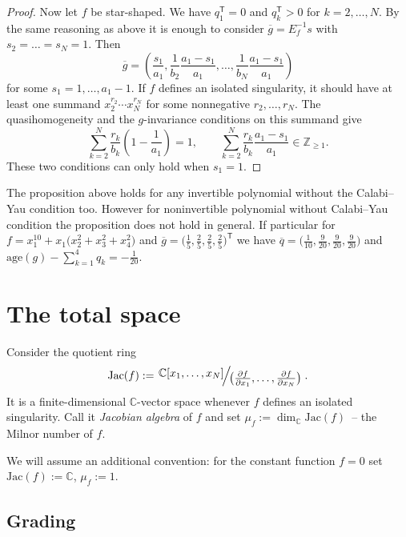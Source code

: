 \documentclass[pdftex]{sigma}
\numberwithin{equation}{section}
\newcommand{\CC}{{\mathbb{C}}}
\newcommand{\ZZ}{{\mathbb{Z}}}
\newcommand{\Jac}{\mathrm{Jac}}
\newcommand{\age}{\mathrm{age}}
\newcommand{\QR}[2]{
\left.\raisebox{0.5ex}{\ensuremath{#1}}
\ensuremath{\mkern-3mu}\Big/\ensuremath{\mkern-3mu}
\raisebox{-0.5ex}{\ensuremath{#2}}\right.}
\begin{document}
\begin{proof}
Now let $f$ be star-shaped. We have $q_1^{\mathsf{T}} = 0$ and $q_k^{\mathsf{T}} > 0$ for $k=2,\dots,N$. By the same reasoning as above it is enough to consider $\overline g = E_f^{-1}s$ with $s_2 = \dots = s_N = 1$. Then
\[
 \overline g = \left(\frac{s_1}{a_1}, \frac{1}{b_2}\frac{a_1-s_1}{a_1}, \dots, \frac{1}{b_{N}}\frac{a_1-s_1}{a_1} \right)
\]
for some $s_1 = 1,\dots,a_1-1$.
If $f$ defines an isolated singularity, it should have at least one summand $x_2^{r_2}\cdots x_N^{r_N}$ for some nonnegative $r_2,\dots,r_N$. The quasihomogeneity and the $g$-invariance conditions on this summand give
\[
 \sum_{k=2}^N \frac{r_k}{b_k}\left(1 - \frac{1}{a_1}\right) = 1, \qquad \sum_{k=2}^N \frac{r_k}{b_k}\frac{a_1-s_1}{a_1} \in \ZZ_{\ge 1}.
\]
These two conditions can only hold when $s_1=1$.
\end{proof}

\begin{Remark}
The proposition above holds for any invertible polynomial without the Calabi--Yau condition too. However for noninvertible polynomial without Calabi--Yau condition the proposition does not hold in general. If particular for ${f = x_1^{10} + x_1\bigl(x_2^2 + x_3^2 + x_4^2\bigr)}$ and $\overline g = \bigl(\frac{1}{5},\frac{2}{5},\frac{2}{5},\frac{2}{5}\bigr)^{\mathsf{T}}$ we have $\overline q = \bigl(\frac{1}{10},\frac{9}{20},\frac{9}{20},\frac{9}{20}\bigr)$ and $\age(g) - \sum_{k=1}^4 q_k = -\frac{1}{20}$.
\end{Remark}

\section{The total space}\label{section: total space}
Consider the quotient ring
\begin{equation*}
	\Jac(f) := \QR{\CC[x_1,\dots, x_N]}{\bigl(\frac{\partial f}{\partial x_1},\dots,\frac{\partial f}{\partial x_N}\bigr)}.
\end{equation*}
It is a finite-dimensional $\CC$-vector space whenever $f$ defines an isolated singularity.
Call it {\em Jacobian algebra} of $f$ and set $\mu_f:=\dim_\CC\Jac(f)$~-- the Milnor number of $f$.

We will assume an additional convention:
for the constant function $f = 0$ set $\Jac(f) := \CC$, $\mu_f := 1$.

\subsection{Grading}
\end{document}
